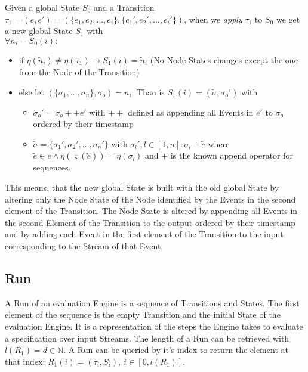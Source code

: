 \begin{definition}[name = Application of a Transition on a State]\label{sec:concepts:def:application_transition}
  Given a global State \(S_0\) and a Transition \(\tau_1 = (e, e') = (\{e_1,e_2,\dots,e_i\}, \{e_1',e_2',\dots,e_i'\})\), when we \emph{apply} \(\tau_1\) to \(S_0\) we get a new global State \(S_1\) with\\
  \(\forall \widetilde{n}_i = S_0(i):\)
  \begin{itemize}
    \item if \(\eta(\widetilde{n}_i) \neq \eta(\tau_1) \rightarrow S_1(i) = \widetilde{n}_i\) (No Node States changes except the one from the Node of the Transition)
    \item else let \((\{\sigma_1,\dots,\sigma_n\}, \sigma_o) = n_i\). Than is \(S_1(i) = (\widetilde{\sigma}, \sigma_o')\) with
      \begin{itemize}
        \item \(\sigma_o' = \sigma_o ++ e'\) with \(++\) defined as appending all Events in \(e'\) to \(\sigma_o\) ordered by their timestamp
        \item \(\widetilde{\sigma} = \{\sigma_1', \sigma_2', \dots, \sigma_n'\}\) with \(\sigma_l', l \in [1,n]: \sigma_l + \widetilde{e}\) where \(\widetilde{e} \in e \land \eta(\varsigma(\widetilde{e})) = \eta(\sigma_l)\) and \(+\) is the known append operator for sequences.
      \end{itemize}
  \end{itemize}

\end{definition}
This means, that the new global State is built with the old global State by altering only the Node State of the Node identified by the Events in the second element of the Transition.
The Node State is altered by appending all Events in the second Element of the Transition to the output ordered by their timestamp and by adding each Event in the first element of the Transition to the input corresponding to the Stream of that Event.

\subsection{Run}
\label{sec:concepts:def:run}

A Run of an evaluation Engine is a sequence of Transitions and States.
The first element of the sequence is the empty Transition and the initial State of the evaluation Engine.
It is a representation of the steps the Engine takes to evaluate a specification over input Streams.
The length of a Run can be retrieved with \(l(R_1) = d \in \mathbb{N}\).
A Run can be queried by it's index to return the element at that index: \(R_1(i)=(\tau_i, S_i),\ i \in [0, l(R_1)]\).

